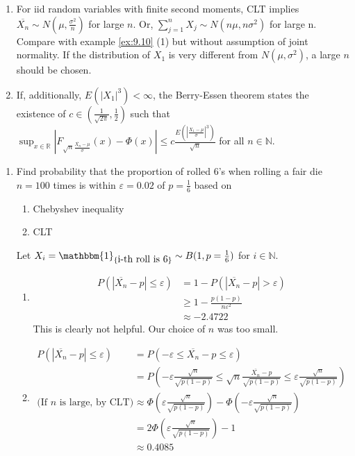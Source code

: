 \documentclass{article}
\newcommand{\R}{\mathbb{R}}
\newcommand{\N}{\mathbb{N}}
\begin{document}
			\begin{myrem}{}{}
				\begin{enumerate}
					\item For iid random variables with finite second moments, CLT implies $\overline{X_n}\sim N(\mu, \frac{\sigma^2}{n})$ for large $n$. Or, $\sum_{j=1}^nX_j\sim N(n\mu, n\sigma^2)$ for large n. Compare with example \ref{ex:9.10} (1) but without assumption of joint normality. If the distribution of $X_1$ is very different from $N(\mu, \sigma^2)$, a large $n$ should be chosen.
					
					\item If, additionally, $E(|X_1|^3)<\infty$, the Berry-Essen theorem states the existence of $c\in(\frac{1}{\sqrt{2\pi}}, \frac{1}{2})$ such that $\sup_{x\in\R}|F_{\sqrt{n}\frac{\overline{X_n}-\mu}{\sigma}}(x)-\Phi(x)|\leq c\frac{E(|\frac{X_1-\mu}{\sigma}|^3)}{\sqrt{n}}$ for all $n\in\N$.
				\end{enumerate}
			\end{myrem}
			
			\newpage
			\begin{myex}{}{}
				\begin{enumerate}
					\item Find probability that the proportion of rolled 6's when rolling a fair die $n=100$ times is within $\varepsilon=0.02$ of $p=\frac{1}{6}$ based on
					\begin{enumerate}[label=(\alph*)]
						\item Chebyshev inequality
						\item CLT
					\end{enumerate}
					
					Let $X_i=\mathbbm{1}_{\{\mbox{i-th roll is 6}\}}\sim B(1, p=\frac{1}{6})$ for $i\in\N$.
					\begin{enumerate}[label=(\alph*)]
						\item
						\begin{align*}
							P(|\overline{X_n}-p|\leq\varepsilon)&=1-P(|\overline{X_n}-p|>\varepsilon)\\
							&\geq1-\frac{p(1-p)}{n\varepsilon^2}\\
							&\approx-2.4722
						\end{align*}
						This is clearly not helpful. Our choice of $n$ was too small.
						\item
						\begin{align*}
							P(|\overline{X_n}-p|\leq\varepsilon)&=P(-\varepsilon\leq\overline{X_n}-p\leq\varepsilon)\\
							&=P(-\varepsilon\frac{\sqrt{n}}{\sqrt{p(1-p)}}\leq\sqrt{n}\frac{\overline{X_n}-p}{\sqrt{p(1-p)}}\leq\varepsilon\frac{\sqrt{n}}{\sqrt{p(1-p)}})\\
							\mbox{(If $n$ is large, by CLT) }&\approx\Phi(\varepsilon\frac{\sqrt{n}}{\sqrt{p(1-p)}})-\Phi(-\varepsilon\frac{\sqrt{n}}{\sqrt{p(1-p)}})\\
							&=2\Phi(\varepsilon\frac{\sqrt{n}}{\sqrt{p(1-p)}})-1\\
							&\approx0.4085
						\end{align*}
					\end{enumerate}
				\end{enumerate}
			\end{myex}
	
\end{document}
